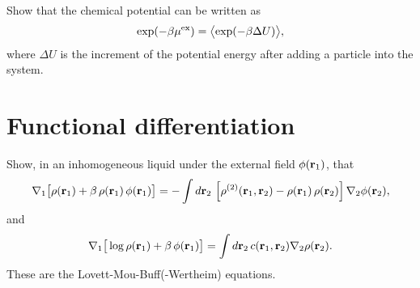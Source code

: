 \documentclass[12pt]{book}
\begin{document}

Show that the chemical potential can be written as
\begin{equation}
  \exp(-\beta { { \mu }^{ \mathrm{ex} } })
=
  \bigl\langle
    \exp( -\beta \Delta U )
  \bigr\rangle,
\end{equation}
%
where $\Delta U$ is the increment of the potential energy
after adding a particle into the system.



\chapter{Functional differentiation}


%
%




Show, in an inhomogeneous liquid under the external field $\phi(\boldsymbol{\mathbf{r}}_1)$, that
%
\begin{align*}
  \nabla_1 \big[
    \rho(\boldsymbol{\mathbf{r}}_1)
  + \beta \, \rho(\boldsymbol{\mathbf{r}}_1) \, \phi(\boldsymbol{\mathbf{r}}_1)
\big]
  =
  -\int d \boldsymbol{\mathbf{r}}_2 \,
    \left[
      \rho^{(2)}(\boldsymbol{\mathbf{r}}_1, \boldsymbol{\mathbf{r}}_2) - \rho(\boldsymbol{\mathbf{r}}_1) \, \rho(\boldsymbol{\mathbf{r}}_2)
    \right]
    \nabla_2 \phi(\boldsymbol{\mathbf{r}}_2),
\end{align*}
%
and
%
\begin{align}
  \nabla_1 \big[
    \log \rho(\boldsymbol{\mathbf{r}}_1) + \beta \, \phi(\boldsymbol{\mathbf{r}}_1)
  \big]
   = \int d \boldsymbol{\mathbf{r}}_2 \,
    c(\boldsymbol{\mathbf{r}}_1, \boldsymbol{\mathbf{r}}_2)
    \nabla_2 \rho(\boldsymbol{\mathbf{r}}_2).
\end{align}
These are the Lovett-Mou-Buff(-Wertheim) equations\cite{lovett1976, wertheim1976}.
\end{document}
